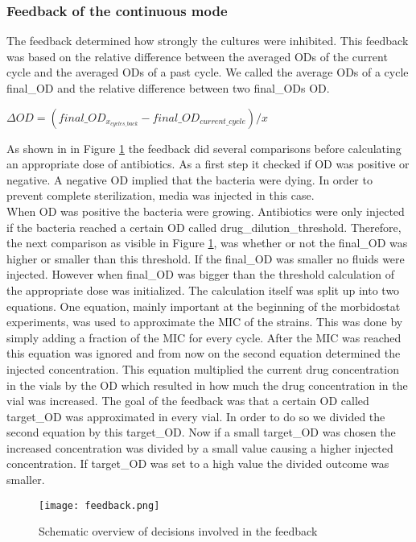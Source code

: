 \subsubsection{Feedback of the continuous mode} 
The feedback determined how strongly the cultures were inhibited. This feedback was based on the relative difference between the averaged ODs of the current cycle and the averaged ODs of a past cycle. We called the average ODs of a cycle final\_OD and the relative difference between two final\_ODs \textDelta OD. 
\begin{center}
	$\Delta OD = (final\_OD_{x_{cycles\_back}} - final\_OD_{current\_cycle})/x$
\end{center}
As shown in in Figure \ref{figure:feedback} the feedback did several comparisons before calculating an appropriate dose of antibiotics. As a first step it checked if \textDelta OD was positive or negative. A negative \textDelta OD implied that the bacteria were dying. In order to prevent complete sterilization, media was injected in this case. \\
When \textDelta OD was positive the bacteria were growing. Antibiotics were only injected if the bacteria reached a certain OD called drug\_dilution\_threshold. Therefore, the next comparison as visible in Figure \ref{figure:feedback}, was whether or not the final\_OD was higher or smaller than this threshold. If the final\_OD was smaller no fluids were injected.
However when final\_OD was bigger than the threshold calculation of the appropriate dose was initialized.
The calculation itself was split up into two equations. One equation, mainly important at the beginning of the morbidostat experiments, was used to approximate the MIC of the strains. This was done by simply adding a fraction of the MIC for every cycle. After the MIC was reached this equation was ignored and from now on the second equation determined the injected concentration. This equation multiplied the current drug concentration in the vials by the \textDelta OD which resulted in how much the drug concentration in the vial was increased.
The goal of the feedback was that a certain OD called target\_OD was approximated in every vial. In order to do so we divided the second equation by this target\_OD. Now if a small target\_OD was chosen the increased concentration was divided by a small value causing a higher injected concentration. If target\_OD was set to a high value the divided outcome was smaller. 

\begin{figure}
	\texttt{[image: feedback.png]}
	\caption{Schematic overview of decisions involved in the feedback}
	\label{figure:feedback}
\end{figure}

